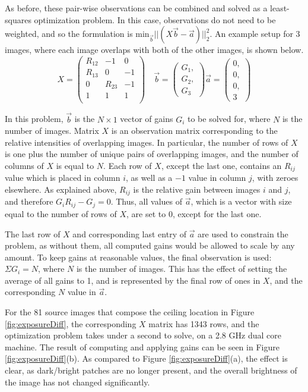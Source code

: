 \documentclass[]{spie}  %
\begin{document}
As before, these pair-wise observations can be combined and solved as
a least-squares optimization problem. In this case, observations do
not need to be weighted, and so the formulation is
$\textrm{min}_{\vec{b}} ||(X \vec{b} - \vec{a})||_2^2 $. An example
setup for 3 images, where each image overlaps with both of the other
images, is shown below.
\[
X =
\begin{pmatrix}
  R_{12} & -1 & 0\\
  R_{13} & 0 & -1\\
  0 & R_{23} & -1\\
  1 & 1 & 1\\

\end{pmatrix}\quad
\vec{b} =
\begin{pmatrix}
  G_1, \\ G_2, \\ G_3
\end{pmatrix}
\vec{a} =
\begin{pmatrix}
  0, \\ 0, \\ 0, \\ 3
\end{pmatrix}
\]

In this problem, $\vec{b}$ is the $N\times1$ vector of gains $G_i$ to
be solved for, where $N$ is the number of images.  Matrix $X$ is an
observation matrix corresponding to the relative intensities of
overlapping images. In particular, the number of rows of $X$ is one
plus the number of unique pairs of overlapping images, and the number
of columns of $X$ is equal to $N$. Each row of $X$, except the last
one, contains an $R_{ij}$ value which is placed in column $i$, as well
as a $-1$ value in column $j$, with zeroes elsewhere. As explained
above, $R_{ij}$ is the relative gain between images $i$ and $j$, and
therefore $G_iR_{ij} - G_j = 0$.  Thus, all values of $\vec{a}$, which
is a vector with size equal to the number of rows of $X$, are set to
$0$, except for the last one.

The last row of $X$ and corresponding last entry of $\vec{a}$ are used
to constrain the problem, as without them, all computed gains would be
allowed to scale by any amount. To keep gains at reasonable values,
the final observation is used: $\Sigma G_i = N$, where $N$ is the
number of images. This has the effect of setting the average of all
gains to 1, and is represented by the final row of ones in $X$, and
the corresponding $N$ value in $\vec{a}$.

For the 81 source images that compose the ceiling location in Figure
\ref{fig:exposureDiff}, the corresponding $X$ matrix has 1343 rows,
and the optimization problem takes under a second to solve, on a 2.8
GHz dual core machine.  The result of computing and applying gains can
be seen in Figure \ref{fig:exposureDiff}(b). As compared to Figure
\ref{fig:exposureDiff}(a), the effect is clear, as dark/bright patches
are no longer present, and the overall brightness of the image has not
changed significantly.
\end{document}
